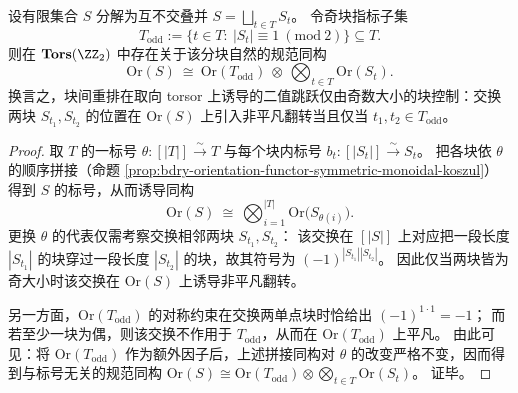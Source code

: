\begin{proposition}\label{prop:bdry-orientation-block-decomposition-odd-visibility}
设有限集合 \(S\) 分解为互不交叠并
\(
S=\bigsqcup_{t\in T}S_t
\)。
令奇块指标子集
\[
T_{\mathrm{odd}}:=\{t\in T:\ |S_t|\equiv 1\ (\mathrm{mod}\ 2)\}\subseteq T.
\]
则在 \(\mathbf{Tors}(\ZZ_2)\) 中存在关于该分块自然的规范同构
\[
\mathrm{Or}(S)\ \cong\ \mathrm{Or}(T_{\mathrm{odd}})\ \otimes\ \bigotimes_{t\in T}\mathrm{Or}(S_t).
\]
换言之，块间重排在取向 torsor 上诱导的二值跳跃仅由奇数大小的块控制：交换两块 \(S_{t_1},S_{t_2}\) 的位置在 \(\mathrm{Or}(S)\) 上引入非平凡翻转当且仅当 \(t_1,t_2\in T_{\mathrm{odd}}\)。
\end{proposition}
\begin{proof}
取 \(T\) 的一标号 \(\theta:[|T|]\xrightarrow{\sim}T\) 与每个块内标号 \(b_t:[|S_t|]\xrightarrow{\sim}S_t\)。
把各块依 \(\theta\) 的顺序拼接（命题 \ref{prop:bdry-orientation-functor-symmetric-monoidal-koszul}）得到 \(S\) 的标号，从而诱导同构
\[
\mathrm{Or}(S)\ \cong\ \bigotimes_{i=1}^{|T|}\mathrm{Or}\!\bigl(S_{\theta(i)}\bigr).
\]
更换 \(\theta\) 的代表仅需考察交换相邻两块 \(S_{t_1},S_{t_2}\)：
该交换在 \([|S|]\) 上对应把一段长度 \(|S_{t_1}|\) 的块穿过一段长度 \(|S_{t_2}|\) 的块，故其符号为 \((-1)^{|S_{t_1}||S_{t_2}|}\)。
因此仅当两块皆为奇大小时该交换在 \(\mathrm{Or}(S)\) 上诱导非平凡翻转。
\par
另一方面，\(\mathrm{Or}(T_{\mathrm{odd}})\) 的对称约束在交换两单点块时恰给出 \((-1)^{1\cdot 1}=-1\)；
而若至少一块为偶，则该交换不作用于 \(T_{\mathrm{odd}}\)，从而在 \(\mathrm{Or}(T_{\mathrm{odd}})\) 上平凡。
由此可见：将 \(\mathrm{Or}(T_{\mathrm{odd}})\) 作为额外因子后，上述拼接同构对 \(\theta\) 的改变严格不变，因而得到与标号无关的规范同构
\(
\mathrm{Or}(S)\cong \mathrm{Or}(T_{\mathrm{odd}})\otimes\bigotimes_{t\in T}\mathrm{Or}(S_t)
\)。
证毕。
\end{proof}

